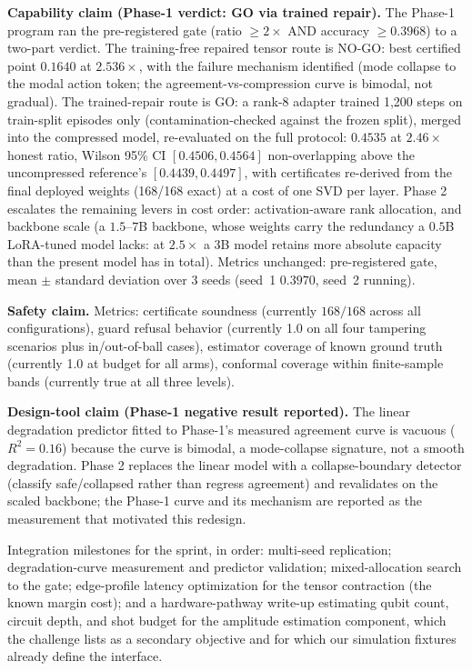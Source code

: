 \documentclass[10pt]{article}
\begin{document}
\textbf{Capability claim (Phase-1 verdict: GO via trained repair).}
The Phase-1 program ran the pre-registered gate (ratio $\ge 2\times$ AND
accuracy $\ge 0.3968$) to a two-part verdict. The training-free repaired
tensor route is NO-GO: best certified point $0.1640$ at $2.536\times$, with
the failure mechanism identified (mode collapse to the modal action token;
the agreement-vs-compression curve is bimodal, not gradual). The
trained-repair route is GO: a rank-8 adapter trained 1{,}200 steps on
train-split episodes only (contamination-checked against the frozen split),
merged into the compressed model, re-evaluated on the full protocol:
$0.4535$ at $2.46\times$ honest ratio, Wilson 95\% CI $[0.4506, 0.4564]$
non-overlapping above the uncompressed reference's $[0.4439, 0.4497]$, with
certificates re-derived from the final deployed weights (168/168 exact) at
a cost of one SVD per layer. Phase 2 escalates the remaining levers in cost
order: activation-aware rank allocation, and backbone scale (a $1.5$--$7$B
backbone, whose weights carry the redundancy a $0.5$B LoRA-tuned model
lacks: at $2.5\times$ a $3$B model retains more absolute capacity than
the present model has in total). Metrics unchanged: pre-registered gate,
mean $\pm$ standard deviation over 3 seeds (seed~1 $0.3970$, seed~2 running).

\textbf{Safety claim.} Metrics: certificate soundness (currently $168/168$
across all configurations), guard refusal behavior (currently 1.0 on all four
tampering scenarios plus in/out-of-ball cases), estimator coverage of known
ground truth (currently 1.0 at budget for all arms), conformal coverage
within finite-sample bands (currently true at all three levels).

\textbf{Design-tool claim (Phase-1 negative result reported).} The linear
degradation predictor fitted to Phase-1's measured agreement curve is
vacuous ($R^{2} = 0.16$) because the curve is bimodal, a mode-collapse
signature, not a smooth degradation. Phase 2 replaces the linear model with
a collapse-boundary detector (classify safe/collapsed rather than regress
agreement) and revalidates on the scaled backbone; the Phase-1 curve and
its mechanism are reported as the measurement that motivated this redesign.

Integration milestones for the sprint, in order: multi-seed replication;
degradation-curve measurement and predictor validation; mixed-allocation
search to the gate; edge-profile latency optimization for the tensor
contraction (the known margin cost); and a hardware-pathway write-up
estimating qubit count, circuit depth, and shot budget for the amplitude
estimation component, which the challenge lists as a secondary objective and
for which our simulation fixtures already define the interface.
\end{document}
